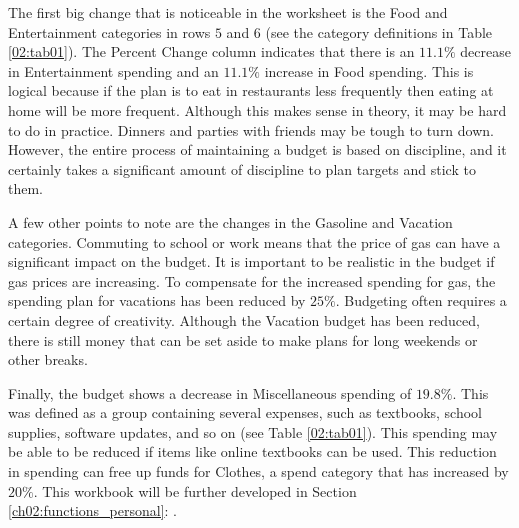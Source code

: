 The first big change that is noticeable in the worksheet is the Food and Entertainment categories in rows $ 5 $ and $ 6 $ (see the category definitions in Table \ref{02:tab01}). The Percent Change column indicates that there is an $ 11.1\% $ decrease in Entertainment spending and an $ 11.1\% $ increase in Food spending. This is logical because if the plan is to eat in restaurants less frequently then eating at home will be more frequent. Although this makes sense in theory, it may be hard to do in practice. Dinners and parties with friends may be tough to turn down. However, the entire process of maintaining a budget is based on discipline, and it certainly takes a significant amount of discipline to plan targets and stick to them.

A few other points to note are the changes in the Gasoline and Vacation categories. Commuting to school or work means that the price of gas can have a significant impact on the budget. It is important to be realistic in the budget if gas prices are increasing. To compensate for the increased spending for gas, the spending plan for vacations has been reduced by $ 25\% $. Budgeting often requires a certain degree of creativity. Although the Vacation budget has been reduced, there is still money that can be set aside to make plans for long weekends or other breaks.

Finally, the budget shows a decrease in Miscellaneous spending of $ 19.8\% $. This was defined as a group containing several expenses, such as textbooks, school supplies, software updates, and so on (see Table \ref{02:tab01}). This spending may be able to be reduced if items like online textbooks can be used. This reduction in spending can free up funds for Clothes, a spend category that has increased by $ 20\% $. This  workbook will be further developed in Section \ref{ch02:functions_personal}: .

